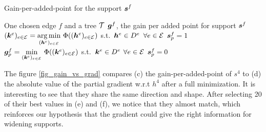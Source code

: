 \begin{algorithm}[!ht]
    \caption{Gain-per-added-point for the support $\bm s^f$} \label{alg_gain_per_added_point}
  \begin{algorithmic}[0]
    \Input One chosen edge $f$ and a tree $\mathcal T$
    \Output $\bm g^f$, the gain per added point for support $\bm s^f$
    \State $(\bm k^e)_{e \in \mathcal E} = \underset{(\bm h^e)_{e \in \mathcal E}}{\arg\min}~ \Phi ((\bm h^e)_{e \in \mathcal E})$ \quad s.t.~$\bm h^e \in D^e$ \quad $\forall e \in \mathcal E$ 
    	\State $\bm s^f_p = 1$ 
    	\State $\bm g^f_p = \underset{(\bm k^e)_{e \in \mathcal E}}{\min}~ \Phi ((\bm k^e)_{e \in \mathcal E})$ \quad s.t.~$\bm k^e \in D^e$ \quad $\forall e \in \mathcal E$
    	\State $\bm s^f_p = 0$ 
    \EndFor
  \end{algorithmic}
\end{algorithm}

The figure \ref{fig_gain_vs_grad} compares (c) the gain-per-added-point of $s^4$ to (d) the absolute value of the partial gradient w.r.t $h^4$ after a full minimization. It is interesting to see that they share the same direction and shape. After selecting 20 of their best values in (e) and (f), we notice that they almost match, which reinforces our hypothesis that the gradient could give the right information for widening supports.

